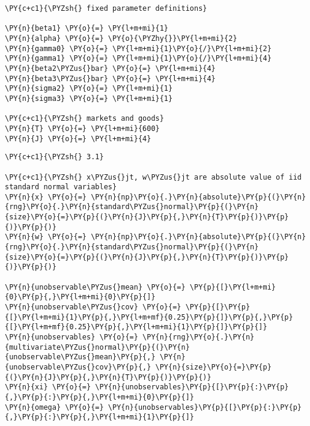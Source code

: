     \begin{tcolorbox}[breakable, size=fbox, boxrule=1pt, pad at break*=1mm,colback=cellbackground, colframe=cellborder]
\begin{Verbatim}[commandchars=\\\{\}]
\PY{c+c1}{\PYZsh{} fixed parameter definitions}

\PY{n}{beta1} \PY{o}{=} \PY{l+m+mi}{1}
\PY{n}{alpha} \PY{o}{=} \PY{o}{\PYZhy{}}\PY{l+m+mi}{2}
\PY{n}{gamma0} \PY{o}{=} \PY{l+m+mi}{1}\PY{o}{/}\PY{l+m+mi}{2}
\PY{n}{gamma1} \PY{o}{=} \PY{l+m+mi}{1}\PY{o}{/}\PY{l+m+mi}{4}
\PY{n}{beta2\PYZus{}bar} \PY{o}{=} \PY{l+m+mi}{4}
\PY{n}{beta3\PYZus{}bar} \PY{o}{=} \PY{l+m+mi}{4}
\PY{n}{sigma2} \PY{o}{=} \PY{l+m+mi}{1}
\PY{n}{sigma3} \PY{o}{=} \PY{l+m+mi}{1}

\PY{c+c1}{\PYZsh{} markets and goods}
\PY{n}{T} \PY{o}{=} \PY{l+m+mi}{600}
\PY{n}{J} \PY{o}{=} \PY{l+m+mi}{4}
\end{Verbatim}
\end{tcolorbox}

    \begin{tcolorbox}[breakable, size=fbox, boxrule=1pt, pad at break*=1mm,colback=cellbackground, colframe=cellborder]
\begin{Verbatim}[commandchars=\\\{\}]
\PY{c+c1}{\PYZsh{} 3.1}

\PY{c+c1}{\PYZsh{} x\PYZus{}jt, w\PYZus{}jt are absolute value of iid standard normal variables}
\PY{n}{x} \PY{o}{=} \PY{n}{np}\PY{o}{.}\PY{n}{absolute}\PY{p}{(}\PY{n}{rng}\PY{o}{.}\PY{n}{standard\PYZus{}normal}\PY{p}{(}\PY{n}{size}\PY{o}{=}\PY{p}{(}\PY{n}{J}\PY{p}{,}\PY{n}{T}\PY{p}{)}\PY{p}{)}\PY{p}{)}
\PY{n}{w} \PY{o}{=} \PY{n}{np}\PY{o}{.}\PY{n}{absolute}\PY{p}{(}\PY{n}{rng}\PY{o}{.}\PY{n}{standard\PYZus{}normal}\PY{p}{(}\PY{n}{size}\PY{o}{=}\PY{p}{(}\PY{n}{J}\PY{p}{,}\PY{n}{T}\PY{p}{)}\PY{p}{)}\PY{p}{)}

\PY{n}{unobservable\PYZus{}mean} \PY{o}{=} \PY{p}{[}\PY{l+m+mi}{0}\PY{p}{,}\PY{l+m+mi}{0}\PY{p}{]}
\PY{n}{unobservable\PYZus{}cov} \PY{o}{=} \PY{p}{[}\PY{p}{[}\PY{l+m+mi}{1}\PY{p}{,}\PY{l+m+mf}{0.25}\PY{p}{]}\PY{p}{,}\PY{p}{[}\PY{l+m+mf}{0.25}\PY{p}{,}\PY{l+m+mi}{1}\PY{p}{]}\PY{p}{]}
\PY{n}{unobservables} \PY{o}{=} \PY{n}{rng}\PY{o}{.}\PY{n}{multivariate\PYZus{}normal}\PY{p}{(}\PY{n}{unobservable\PYZus{}mean}\PY{p}{,} \PY{n}{unobservable\PYZus{}cov}\PY{p}{,} \PY{n}{size}\PY{o}{=}\PY{p}{(}\PY{n}{J}\PY{p}{,}\PY{n}{T}\PY{p}{)}\PY{p}{)}
\PY{n}{xi} \PY{o}{=} \PY{n}{unobservables}\PY{p}{[}\PY{p}{:}\PY{p}{,}\PY{p}{:}\PY{p}{,}\PY{l+m+mi}{0}\PY{p}{]}
\PY{n}{omega} \PY{o}{=} \PY{n}{unobservables}\PY{p}{[}\PY{p}{:}\PY{p}{,}\PY{p}{:}\PY{p}{,}\PY{l+m+mi}{1}\PY{p}{]}
\end{Verbatim}
\end{tcolorbox}

